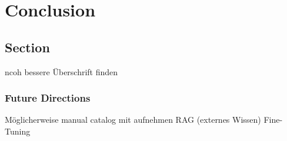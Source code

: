 \chapter{Conclusion}\label{chapter:Conclusion}

\section{Section}
ncoh bessere Überschrift finden

\subsection{Future Directions}
Möglicherweise manual catalog mit aufnehmen
RAG (externes Wissen)
Fine-Tuning